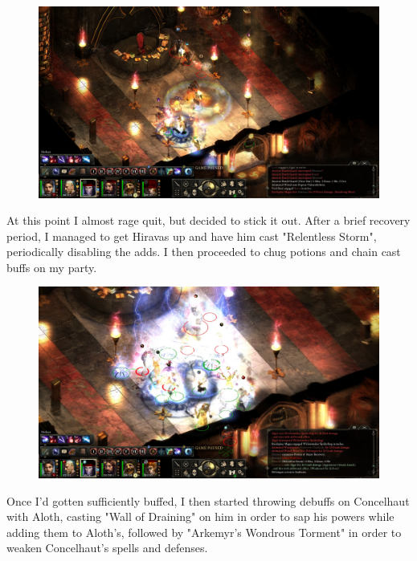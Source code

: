 \documentclass{article}
\begin{document}
\begin{figure}
\includegraphics[scale=0.33]{files/blog/2019_08_17_poe_potd_wmpt1/2019_08_17_concelhaut_2.jpg}
\end{figure}

At this point I almost rage quit, but decided to stick it out.  After a brief recovery period, I managed to get Hiravas up and have him cast "Relentless Storm", periodically disabling the adds.  I then proceeded to chug potions and chain cast buffs on my party.

\begin{figure}
\includegraphics[scale=0.33]{files/blog/2019_08_17_poe_potd_wmpt1/2019_08_17_concelhaut_3.jpg}
\end{figure}

Once I'd gotten sufficiently buffed, I then started throwing debuffs on Concelhaut with Aloth, casting "Wall of Draining" on him in order to sap his powers while adding them to Aloth's, followed by "Arkemyr's Wondrous Torment" in order to weaken Concelhaut's spells and defenses.
\end{document}

